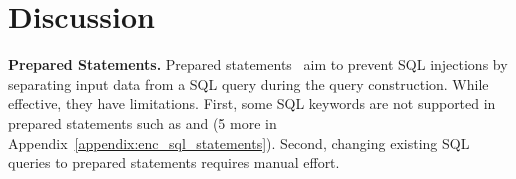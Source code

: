 \vspace{-0.5em}
\section{Discussion}
\label{sec:discussion}


\noindent
{\bf Prepared Statements.}
Prepared statements~\cite{prepared_statements} aim to prevent SQL injections by separating input data from a SQL query during the query construction.
While effective, they have limitations. First, some SQL keywords are not supported in prepared statements such as  and  (5 more in Appendix~\ref{appendix:enc_sql_statements}). Second, changing existing SQL queries to prepared statements requires manual effort. 


